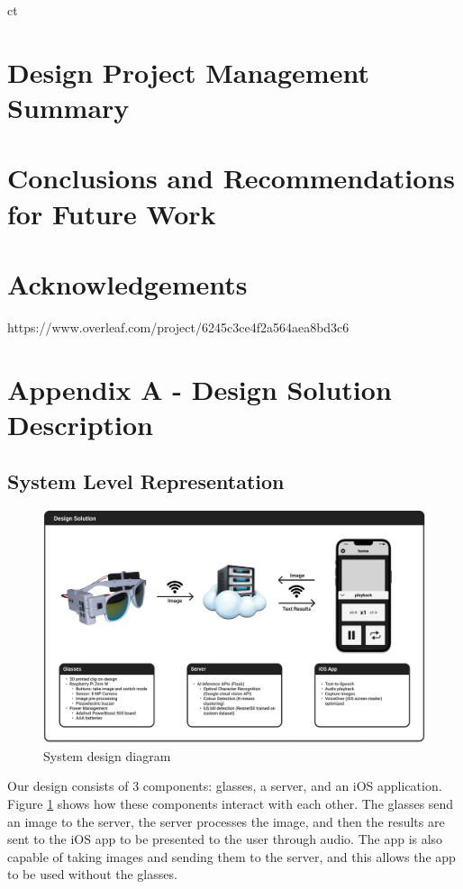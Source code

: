 ct\documentclass[a4paper,11pt]{article}
\begin{document}
\section{Design Project Management Summary}

\section{Conclusions and Recommendations for Future Work}

\section{Acknowledgements}
https://www.overleaf.com/project/6245c3ce4f2a564aea8bd3c6
\newpage
\section{Appendix A - Design Solution Description}
\subsection{System Level Representation}

\begin{figure}[H]
\centering
\includegraphics[scale=0.265]{img/system_diagrams/system_diagram_v4.png}
\caption{System design diagram}
\label{fig:system_diagram}
\end{figure}

Our design consists of 3 components: glasses, a server, and an iOS application. Figure \ref{fig:system_diagram} shows how these components interact with each other. The glasses send an image to the server, the server processes the image, and then the results are sent to the iOS app to be presented to the user through audio. The app is also capable of taking images and sending them to the server, and this allows the app to be used without the glasses.
\end{document}
